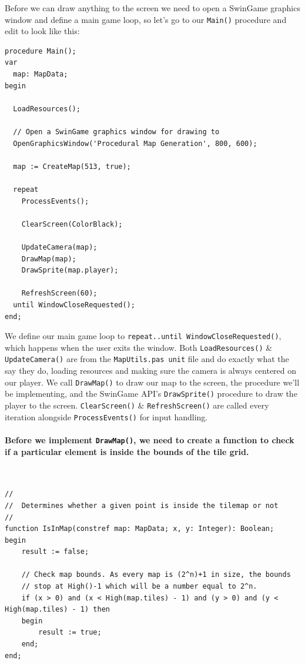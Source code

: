 \documentclass{article}
\begin{document}
Before we can draw anything to the screen we need to open a SwinGame graphics window and define a main game loop, so let's go to our \texttt{Main()} procedure and edit to look like this:

\begin{verbatim}
procedure Main();
var
  map: MapData;
begin

  LoadResources();
  
  // Open a SwinGame graphics window for drawing to
  OpenGraphicsWindow('Procedural Map Generation', 800, 600);
  
  map := CreateMap(513, true);

  repeat
    ProcessEvents();

    ClearScreen(ColorBlack);
    
    UpdateCamera(map);
    DrawMap(map);
    DrawSprite(map.player);

    RefreshScreen(60);
  until WindowCloseRequested();
end;
\end{verbatim}

We define our main game loop to \texttt{repeat..until WindowCloseRequested()}, which happens when the user exits the window. Both \texttt{LoadResources()} \& \texttt{UpdateCamera()} are from the \texttt{MapUtils.pas unit} file and do exactly what the say they do, loading resources and making sure the camera is always centered on our player. We call \texttt{DrawMap()} to draw our map to the screen, the procedure we'll be implementing, and the SwinGame API's \texttt{DrawSprite()} procedure to draw the player to the screen. \texttt{ClearScreen()} \& \texttt{RefreshScreen()} are called every iteration alongside \texttt{ProcessEvents()} for input handling.

\paragraph{Before we implement \texttt{DrawMap()}, we need to create a function to check if a particular element is inside the bounds of the tile grid.} \

\begin{mdframed}[backgroundcolor=darkgray]
\begin{verbatim}
//
//	Determines whether a given point is inside the tilemap or not
//
function IsInMap(constref map: MapData; x, y: Integer): Boolean;
begin
	result := false;

	// Check map bounds. As every map is (2^n)+1 in size, the bounds
	// stop at High()-1 which will be a number equal to 2^n.
	if (x > 0) and (x < High(map.tiles) - 1) and (y > 0) and (y < High(map.tiles) - 1) then
	begin
		result := true;
	end;
end;
\end{verbatim}
\end{mdframed}
\end{document}
